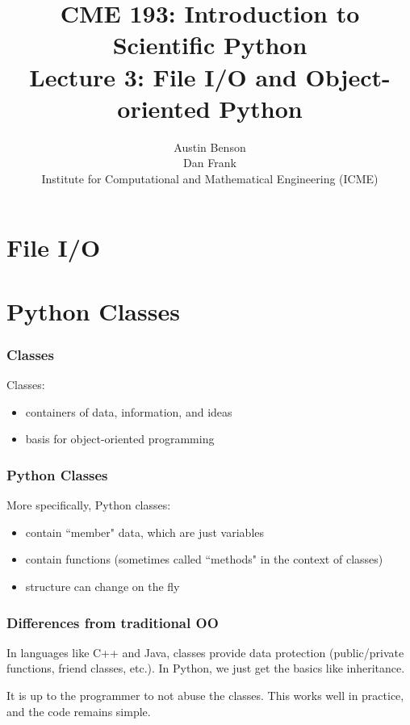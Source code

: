 \documentclass{beamer}
\title{CME 193: Introduction to Scientific Python \\
Lecture 3: File I/O and Object-oriented Python}
\author{Austin Benson \\
\vspace{0.1in}
Dan Frank \\
\vspace{0.1in}
Institute for Computational and Mathematical Engineering (ICME)}
\begin{document}
\maketitle

\section{File I/O}
\begin{frame}

\end{frame}

\section{Python Classes}

\begin{frame}
\frametitle{Classes}

Classes:
\vspace{0.1in}
\begin{itemize}
\setlength{\itemsep}{0.1in}
\item{containers of data, information, and ideas}
\item{basis for object-oriented programming}
\end{itemize}

\end{frame}

\begin{frame}
\frametitle{Python Classes}

More specifically, Python classes:
\vspace{0.1in}
\begin{itemize}
\setlength{\itemsep}{0.1in}
\item{contain ``member" data, which are just variables}
\item{contain functions (sometimes called ``methods" in the context of classes)}
\item{structure can change on the fly}
\end{itemize}

\end{frame}

\begin{frame}
\frametitle{Differences from traditional OO}

In languages like C++ and Java, classes provide data protection (public/private functions, friend classes, etc.).  In Python, we just get the basics like inheritance.

\vspace{0.2in}

It is up to the programmer to not abuse the classes.  This works well in practice, and the code remains simple.
\end{frame}
\end{document}
